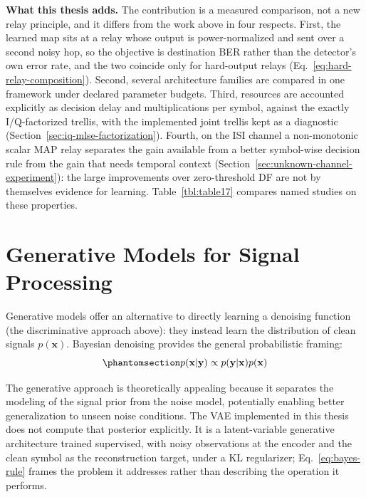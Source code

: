 \textbf{What this thesis adds.} The contribution is a measured comparison, not a new relay principle, and it differs from the work above in four respects. First, the learned map sits at a relay whose output is power-normalized and sent over a second noisy hop, so the objective is destination BER rather than the detector's own error rate, and the two coincide only for hard-output relays (Eq.~\eqref{eq:hard-relay-composition}). Second, several architecture families are compared in one framework under declared parameter budgets. Third, resources are accounted explicitly as decision delay and multiplications per symbol, against the exactly I/Q-factorized trellis, with the implemented joint trellis kept as a diagnostic (Section~\ref{sec:iq-mlse-factorization}). Fourth, on the ISI channel a non-monotonic scalar MAP relay separates the gain available from a better symbol-wise decision rule from the gain that needs temporal context (Section~\ref{sec:unknown-channel-experiment}): the large improvements over zero-threshold DF are not by themselves evidence for learning. Table~\ref{tbl:table17} compares named studies on these properties.

\section{Generative Models for Signal Processing}\label{sec:generative-models-for-signal-processing}

Generative models offer an alternative to directly learning a denoising function (the discriminative approach above): they instead learn the distribution of clean signals \(p(\mathbf{x})\). Bayesian denoising provides the general probabilistic framing:
\begin{equation}\protect\phantomsection\label{eq:bayes-rule}{p(\mathbf{x} | \mathbf{y}) \propto p(\mathbf{y} | \mathbf{x}) p(\mathbf{x})}
\end{equation}

The generative approach is theoretically appealing because it separates the modeling of the signal prior from the noise model, potentially enabling better generalization to unseen noise conditions. The VAE implemented in this thesis does not compute that posterior explicitly. It is a latent-variable generative architecture trained supervised, with noisy observations at the encoder and the clean symbol as the reconstruction target, under a KL regularizer; Eq.~\eqref{eq:bayes-rule} frames the problem it addresses rather than describing the operation it performs.

